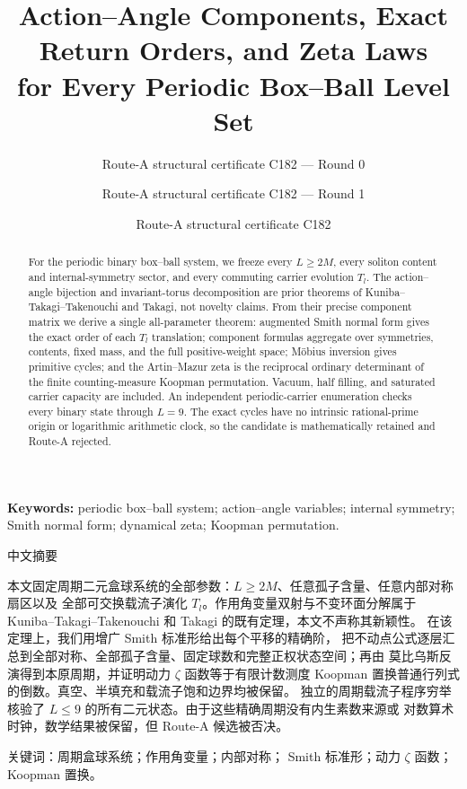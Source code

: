 \documentclass[10pt]{article}
\title{Action--Angle Components, Exact Return Orders, and Zeta Laws\\
for Every Periodic Box--Ball Level Set}
\author{Route-A structural certificate C182 --- Round 0}
\author{Route-A structural certificate C182 --- Round 1}
\author{Route-A structural certificate C182}
\date{}
\begin{document}
\maketitle
\begin{abstract}
For the periodic binary box--ball system, we freeze every $L\ge2M$, every
soliton content and internal-symmetry sector, and every commuting carrier
evolution $T_l$.  The action--angle bijection and invariant-torus
decomposition are prior theorems of Kuniba--Takagi--Takenouchi and Takagi,
not novelty claims.  From their precise component matrix we derive a single
all-parameter theorem: augmented Smith normal form gives the exact order of
each $T_l$ translation; component formulas aggregate over symmetries,
contents, fixed mass, and the full positive-weight space; M\"obius inversion
gives primitive cycles; and the Artin--Mazur zeta is the reciprocal ordinary
determinant of the finite counting-measure Koopman permutation.  Vacuum,
half filling, and saturated carrier capacity are included.  An independent
periodic-carrier enumeration checks every binary state through $L=9$.
The exact cycles have no intrinsic rational-prime origin or logarithmic
arithmetic clock, so the candidate is mathematically retained and Route-A
rejected.
\end{abstract}
\noindent\textbf{Keywords:} periodic box--ball system; action--angle
variables; internal symmetry; Smith normal form; dynamical zeta; Koopman
permutation.

\begin{otherlanguage}{chinese-simplified}
\begin{center}{\large 中文摘要}\end{center}
本文固定周期二元盒球系统的全部参数：$L\ge2M$、任意孤子含量、任意内部对称扇区以及
全部可交换载流子演化 $T_l$。作用角变量双射与不变环面分解属于
\foreignlanguage{english}{Kuniba--Takagi--Takenouchi} 和
\foreignlanguage{english}{Takagi} 的既有定理，本文不声称其新颖性。
在该定理上，我们用增广 \foreignlanguage{english}{Smith} 标准形给出每个平移的精确阶，
把不动点公式逐层汇总到全部对称、全部孤子含量、固定球数和完整正权状态空间；再由
莫比乌斯反演得到本原周期，并证明动力 $\zeta$ 函数等于有限计数测度
\foreignlanguage{english}{Koopman} 置换普通行列式的倒数。真空、半填充和载流子饱和边界均被保留。
独立的周期载流子程序穷举核验了 $L\le9$ 的所有二元状态。由于这些精确周期没有内生素数来源或
对数算术时钟，数学结果被保留，但 \foreignlanguage{english}{Route-A} 候选被否决。

\noindent 关键词：周期盒球系统；作用角变量；内部对称；
\foreignlanguage{english}{Smith} 标准形；动力 $\zeta$ 函数；
\foreignlanguage{english}{Koopman} 置换。
\end{otherlanguage}
\end{document}
